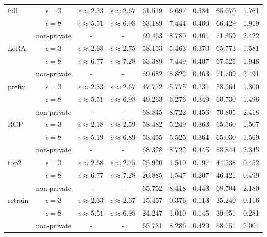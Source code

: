 \begin{table}[h]
\begin{tabular}{l c c c ccccc}
\midrule
\multirow{3}[1]{*}{full}
 & $\epsilon=3$  & $\epsilon \approx 2.33$  & $\epsilon \approx 2.67$  & 61.519  & 6.697  & 0.384  & 65.670 & 1.761 \\
 & $\epsilon=8$  & $\epsilon \approx 5.51$  & $\epsilon \approx 6.98$  & 63.189 & 7.444 & 0.400 & 66.429 & 1.919\\
 & non-private  & -  & -  & 69.463 & 8.780 & 0.461 & 71.359 & 2.422\\
\midrule
\multirow{3}[1]{*}{LoRA}
 & $\epsilon=3$  & $\epsilon \approx 2.68$  & $\epsilon \approx 2.75$  & 58.153 & 5.463 & 0.370 & 65.773  & 1.581\\
 & $\epsilon=8$  & $\epsilon \approx 6.77$  & $\epsilon \approx 7.28$  & 63.389  & 7.449  & 0.407  & 67.525  & 1.948 \\
 & non-private  & -  & -  & 69.682 & 8.822 & 0.463 & 71.709 & 2.491\\
\midrule
\multirow{3}[1]{*}{prefix}
 & $\epsilon=3$  & $\epsilon \approx 2.33$  & $\epsilon \approx 2.67$  & 47.772 & 5.775 & 0.331 & 58.964 & 1.300\\
 & $\epsilon=8$  & $\epsilon \approx 5.51$  & $\epsilon \approx 6.98$  & 49.263 & 6.276 & 0.349 & 60.730 & 1.496\\
 & non-private  & -  & -  & 68.845 & 8.722 & 0.456 & 70.805 & 2.418\\
\midrule
\multirow{3}[1]{*}{RGP}
 & $\epsilon=3$  & $\epsilon \approx 2.18$  & $\epsilon \approx 2.59$  & 58.482 & 5.249 & 0.363 & 65.560 & 1.507\\
 & $\epsilon=8$  & $\epsilon \approx 5.19$  & $\epsilon \approx 6.89$  & 58.455 & 5.525 & 0.364 & 65.030 & 1.569\\
 & non-private  & -  & -  & 68.328 & 8.722 & 0.445 & 68.844 & 2.345\\
\midrule
\multirow{3}[1]{*}{top2}
 & $\epsilon=3$  & $\epsilon \approx 2.68$  & $\epsilon \approx 2.75$  & 25.920 & 1.510 & 0.197 & 44.536 & 0.452\\
 & $\epsilon=8$  & $\epsilon \approx 6.77$  & $\epsilon \approx 7.28$  & 26.885 & 1.547 & 0.207 & 46.421 & 0.499\\
 & non-private  & -  & -  & 65.752 & 8.418 & 0.443 & 68.704 & 2.180\\
\midrule
\multirow{3}[1]{*}{retrain}
 & $\epsilon=3$  & $\epsilon \approx 2.33$  & $\epsilon \approx 2.67$  & 15.457 & 0.376 & 0.113 & 35.240 & 0.116\\
 & $\epsilon=8$  & $\epsilon \approx 5.51$  & $\epsilon \approx 6.98$  & 24.247 & 1.010 & 0.145 & 39.951 & 0.281\\
 & non-private  & -  & -  & 65.731 & 8.286 & 0.429 & 68.751 & 2.004\\
\bottomrule
\end{tabular}
\label{table:e2e}
\end{table}
